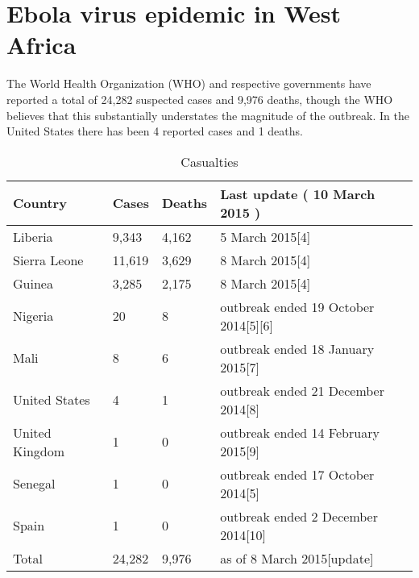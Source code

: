 \documentclass{article}\usepackage[]{graphicx}\usepackage[]{color}
\begin{document}
\section*{Ebola virus epidemic in West Africa}



The World Health Organization (WHO) and respective governments have reported a total of 24,282 suspected cases and 9,976 deaths, though the WHO believes that this substantially understates the magnitude of the outbreak. In the United States there has been 4 reported cases and 1 deaths.  


\begin{table}[ht]
\centering
\caption{Casualties} 
\begin{tabular}{llll}
  \hline
Country & Cases & Deaths & Last update ( 10 March 2015 ) \\ 
  \hline
Liberia & 9,343 & 4,162 & 5 March 2015[4] \\ 
  Sierra Leone & 11,619 & 3,629 & 8 March 2015[4] \\ 
  Guinea & 3,285 & 2,175 & 8 March 2015[4] \\ 
  Nigeria & 20 & 8 & outbreak ended 19 October 2014[5][6] \\ 
  Mali & 8 & 6 & outbreak ended 18 January 2015[7] \\ 
  United States & 4 & 1 & outbreak ended 21 December 2014[8] \\ 
  United Kingdom & 1 & 0 & outbreak ended 14 February 2015[9] \\ 
  Senegal & 1 & 0 & outbreak ended 17 October 2014[5] \\ 
  Spain & 1 & 0 & outbreak ended 2 December 2014[10] \\ 
  Total & 24,282 & 9,976 & as of 8 March 2015[update] \\ 
   \hline
\end{tabular}
\end{table}
\end{document}
